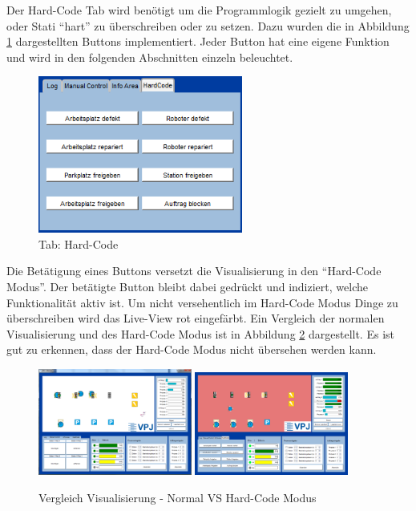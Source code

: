 Der Hard-Code Tab wird benötigt um die Programmlogik gezielt zu umgehen, oder Stati "`hart"' zu überschreiben oder zu setzen. Dazu wurden die in Abbildung \ref{fig:HardCode} dargestellten Buttons implementiert. Jeder Button hat eine eigene Funktion und wird in den folgenden Abschnitten einzeln beleuchtet. 

\begin{figure}[htb]
    \centering
    \includegraphics[width=0.6\textwidth]{Abbildungen/HardCode.png}
    \caption{Tab: Hard-Code}		
    \label{fig:HardCode}
\end{figure}

Die Betätigung eines Buttons versetzt die Visualisierung in den "`Hard-Code Modus"'. Der betätigte Button bleibt dabei gedrückt und indiziert, welche Funktionalität aktiv ist. Um nicht versehentlich im Hard-Code Modus Dinge zu überschreiben wird das Live-View rot eingefärbt. Ein Vergleich der normalen Visualisierung und des Hard-Code Modus ist in Abbildung \ref{fig:GesamtprogrammROT} dargestellt. Es ist gut zu erkennen, dass der Hard-Code Modus nicht übersehen werden kann. 

\begin{figure}[htb]
    \centering
    \includegraphics[width=0.45\textwidth]{Abbildungen/Gesamtprogramm.png}
    \includegraphics[width=0.45\textwidth]{Abbildungen/GesamtprogrammROT.png}
    \caption{Vergleich Visualisierung - Normal VS Hard-Code Modus}		
    \label{fig:GesamtprogrammROT}
\end{figure}

